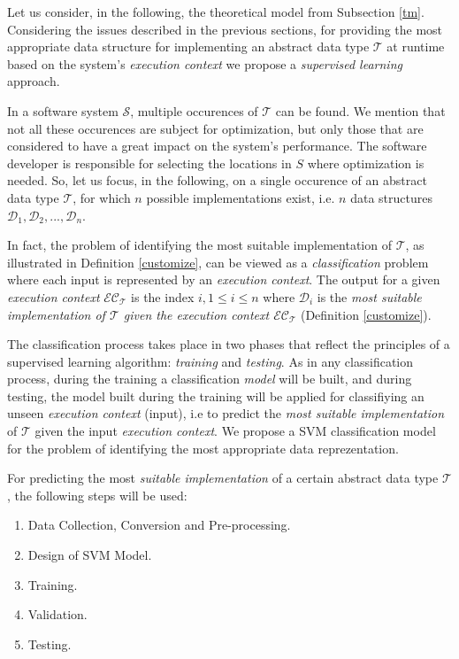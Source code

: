 Let us consider, in the following, the theoretical model from Subsection \ref{tm}. Considering the issues described in the previous sections, for providing the most appropriate data structure for implementing an abstract data type $\mathcal{T}$ at runtime based on the system's \emph{execution context} we propose a \emph{supervised learning} \cite{mitchell} approach. 

In a software system $\mathcal{S}$, multiple occurences of $\mathcal{T}$ can be found. We mention that not all these occurences are subject for optimization, but only those that are considered to have a great impact on the system's performance. The software developer is responsible for selecting the locations in $S$ where optimization is needed. So, let us focus, in the following, on a single occurence of an abstract data type $\mathcal{T}$, for which $n$ possible implementations exist, i.e. $n$ data structures $\mathcal{D}_1, \mathcal{D}_2, ... , \mathcal{D}_n$.

In fact, the problem of identifying the most suitable implementation of $\mathcal{T}$, as illustrated in Definition \ref{customize}, can be viewed as a \emph{classification} \cite{mitchell} problem where each input is represented by an \emph{execution context}. The output for a given \emph{execution context} $\mathcal{EC}_\mathcal{T}$ is the index $i, 1 \leq i \leq n$ where $\mathcal{D}_i$ is the \emph{most suitable implementation of $\mathcal{T}$ given the execution context $\mathcal{EC}_\mathcal{T}$} (Definition \ref{customize}).

The classification process takes place in two phases that reflect the principles of a supervised learning algorithm: \emph{training} and \emph{testing}. As in any classification process, during the training a classification \emph{model} will be built, and during testing, the model built during the training will be applied for classifiying an unseen \emph{execution context} (input), i.e to predict the \emph{most suitable implementation} of $\mathcal{T}$ given the input \emph{execution context}. We propose a SVM classification model for the problem of identifying the most appropriate data reprezentation. 

For predicting the most \emph{suitable implementation} of a certain abstract data type $\mathcal{T}$, the following steps will be used:

\begin{enumerate}

\item Data Collection, Conversion and Pre-processing. 

\item Design of SVM Model.

\item Training.

\item Validation.

\item Testing.

\end{enumerate}

